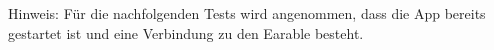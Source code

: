 \documentclass[a4paper,12pt]{article}
\begin{document}
\begin{figure}
   \hfill
\end{figure}
\FloatBarrier

Hinweis: Für die nachfolgenden Tests wird angenommen, dass die App bereits gestartet ist und eine Verbindung zu den Earable besteht.
\end{document}
